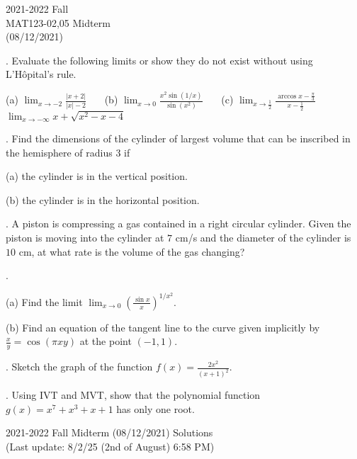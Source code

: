 \documentclass{article}
\begin{document}
\pagestyle{empty}
\large

\begin{center}
2021-2022 Fall\\MAT123-02,05 Midterm\\(08/12/2021)
\end{center}

. Evaluate the following limits or show they do not exist without using L'Hôpital's rule.

\hfill

(a) $\displaystyle \lim_{x\to-2}\frac{\left|x+2\right|}{\left|x\right|-2}$ \ \ \ (b) $\displaystyle\lim_{x\to0}\frac{x^2\sin(1/x)}{\sin\left(x^2\right)}$ \ \ \ (c) $\displaystyle \lim_{x\to\frac12}\frac{\arccos x- \frac\pi3}{x-\frac12}$ \ \ \ $\displaystyle\lim_{x\to-\infty}x+\sqrt{x^2-x-4}$

\hfill

. Find the dimensions of the cylinder of largest volume that can be inscribed in the hemisphere of radius $3$ if

\hfill

(a) the cylinder is in the vertical position.

\hfill

(b) the cylinder is in the horizontal position.

\hfill

. A piston is compressing a gas contained in a right circular cylinder. Given the piston is moving into the cylinder at $7 $ cm/s and the diameter of the cylinder is $10$ cm, at what rate is the volume of the gas changing?

\hfill

.

(a) Find the limit $\displaystyle\lim_{x\to0}\left(\frac{\sin x}x\right)^{1/x^2}$.

\hfill

(b) Find an equation of the tangent line to the curve given implicitly by $\displaystyle \frac xy=\cos\left(\pi xy\right)$ at the point $(-1,1)$.

\hfill

. Sketch the graph of the function $\displaystyle f(x)=\frac{2x^2}{\left(x+1\right)^2}$.

\hfill

. Using IVT and MVT, show that the polynomial function $g(x) = x^7+x^3+x+1$ has only one root.

\newpage

\begin{center}
2021-2022 Fall Midterm (08/12/2021) Solutions\\
(Last update: 8/2/25 (2nd of August) 6:58 PM)
\end{center}
\end{document}
